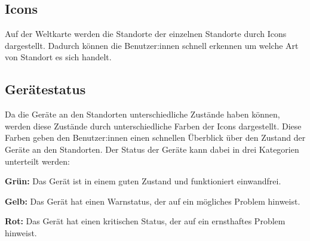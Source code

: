 \subsection{Icons}
\label{subsec:icons}

Auf der Weltkarte werden die Standorte der einzelnen Standorte durch Icons dargestellt.
Dadurch können die Benutzer:innen schnell erkennen um welche Art von Standort es sich handelt.


\subsection{Gerätestatus}

Da die Geräte an den Standorten unterschiedliche Zustände haben können,
werden diese Zustände durch unterschiedliche Farben der Icons dargestellt.
Diese Farben geben den Benutzer:innen einen schnellen Überblick über den Zustand der Geräte an den Standorten.
Der Status der Geräte kann dabei in drei Kategorien unterteilt werden:
\begin{compactitem}
    \item \textbf{Grün:} Das Gerät ist in einem guten Zustand und funktioniert einwandfrei.
    \item \textbf{Gelb:} Das Gerät hat einen Warnstatus, der auf ein mögliches Problem hinweist.
    \item \textbf{Rot:} Das Gerät hat einen kritischen Status, der auf ein ernsthaftes Problem hinweist.
\end{compactitem}


